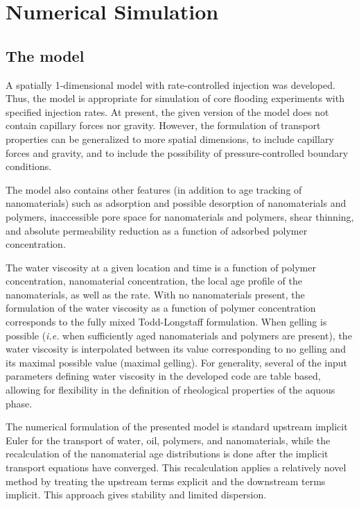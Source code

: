 \documentclass[nanomaterials,article,submit,moreauthors,pdftex]{Definitions/mdpi}
\begin{document}
\section{Numerical Simulation}
\subsection{The model}
A spatially 1-dimensional model with rate-controlled injection was developed. Thus, the model is appropriate for simulation of core flooding experiments with specified injection rates. At present, the given version of the model does not contain capillary forces nor gravity. However, the formulation of transport properties can be generalized to more spatial dimensions, to include capillary forces and gravity, and to include the possibility of pressure-controlled boundary conditions. 

The model also contains other features (in addition to age tracking of nanomaterials) such as adsorption and possible desorption of nanomaterials and polymers, inaccessible pore space for nanomaterials and polymers, shear thinning, and absolute permeability reduction as a function of adsorbed polymer concentration. 

The water viscosity at a given location and time is a function of polymer concentration, nanomaterial concentration, the local age profile of the nanomaterials, as well as the rate. With no nanomaterials present, the formulation of the water viscosity as a function of polymer concentration corresponds to the fully mixed Todd-Longstaff formulation. When gelling is possible (\textit{i.e.} when sufficiently aged nanomaterials and polymers are present), the water viscosity is interpolated between its value corresponding to no gelling and its maximal possible value (maximal gelling).  For generality, several of the input parameters defining water viscosity in the developed code are table based, allowing for flexibility in the definition of rheological properties of the aquous phase.

The numerical formulation of the presented model is standard upstream implicit Euler for the transport of water, oil, polymers, and nanomaterials, while the recalculation of the nanomaterial age distributions is done after the implicit transport equations have converged. This recalculation applies a relatively novel method \citep{Flatten2008} by treating the upstream terms explicit and the downstream terms implicit. This approach gives stability and limited dispersion. 
\end{document}
